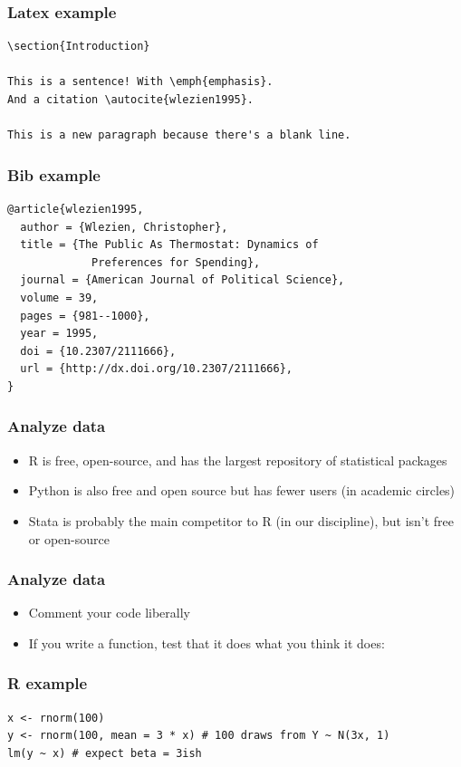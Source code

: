 \documentclass[bigger, aspectratio=169]{beamer}
\begin{document}
\begin{frame}[fragile]
  \frametitle{Latex example}
\begin{verbatim}
\section{Introduction}

This is a sentence! With \emph{emphasis}. 
And a citation \autocite{wlezien1995}. 

This is a new paragraph because there's a blank line. 
\end{verbatim}
\end{frame}

\begin{frame}[fragile]
  \frametitle{Bib example}
\begin{verbatim}
@article{wlezien1995,
  author = {Wlezien, Christopher},
  title = {The Public As Thermostat: Dynamics of 
             Preferences for Spending},
  journal = {American Journal of Political Science},
  volume = 39,
  pages = {981--1000},
  year = 1995,
  doi = {10.2307/2111666},
  url = {http://dx.doi.org/10.2307/2111666},
}
\end{verbatim}
\end{frame}

\begin{frame}
  \frametitle{Analyze data}
  \begin{itemize}
  \item R is free, open-source, and has the largest repository of statistical packages
  \item Python is also free and open source but has fewer users (in academic circles)
  \item Stata is probably the main competitor to R (in our discipline), but isn't free or open-source
  \end{itemize}
\end{frame}

\begin{frame}[fragile]
  \frametitle{Analyze data}
  \begin{itemize}
  \item Comment your code liberally
  \item If you write a function, test that it does what you think it does:
  \end{itemize}
\end{frame}

\begin{frame}[fragile]
  \frametitle{R example}
\begin{verbatim}
x <- rnorm(100) 
y <- rnorm(100, mean = 3 * x) # 100 draws from Y ~ N(3x, 1)
lm(y ~ x) # expect beta = 3ish
\end{verbatim}
\end{frame}
\end{document}
